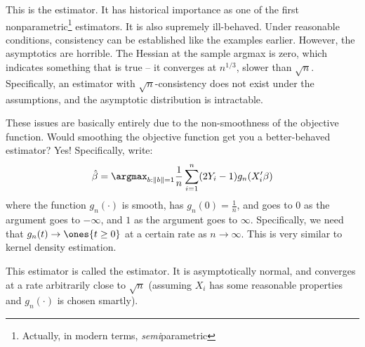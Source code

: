 \documentclass[10pt]{article}
\begin{document}
\begin{example}
	This is the  estimator. It has historical importance as one of the first nonparametric\footnote{Actually, in modern terms, \emph{semi}parametric} estimators. It is also supremely ill-behaved. Under reasonable conditions, consistency can be established like the examples earlier. However, the asymptotics are horrible. The Hessian at the sample argmax is zero, which indicates something that is true -- it converges at $n^{1/3}$, slower than $\sqrt{n}$. Specifically, an estimator with $\sqrt{n}$-consistency does not exist under the assumptions, and the asymptotic distribution is intractable.  
	
	These issues are basically entirely due to the non-smoothness of the objective function. Would smoothing the objective function get you a better-behaved estimator? Yes! Specifically, write: \[\hat{\beta} = \argmax_{b : \|b\|=1} \frac{1}{n} \sum_{i=1}^n (2Y_i - 1) g_n(X_i'\beta)\]where the function $g_n(\cdot)$ is smooth, has $g_n(0) = \frac{1}{n}$, and goes to 0 as the argument goes to $-\infty$, and $1$ as the argument goes to $\infty$. Specifically, we need that $g_n(t) \to \ones\{t \ge 0\}$ at a certain rate as $n \to \infty$. This is very similar to kernel density estimation. 
	
	This estimator is called the  estimator. It is asymptotically normal, and converges at a rate arbitrarily close to $\sqrt{n}$ (assuming $X_i$ has some reasonable properties and $g_n(\cdot)$ is chosen smartly).
\end{example}
\end{document}
